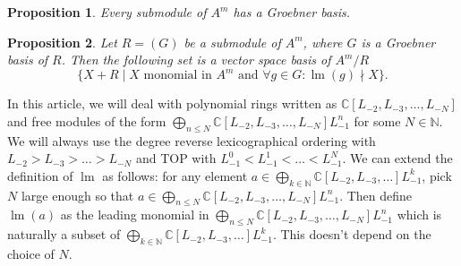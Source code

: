 \documentclass[12pt,a4paper]{article}
\newtheorem{proposition}{Proposition}
\DeclareMathOperator{\lm}{lm}
\begin{document}
\begin{proposition}
  \label{prp:7}
  Every submodule of $A^m$ has a Groebner basis.
\end{proposition}

\begin{proposition}
  \label{prp:8}
  Let $R=(G)$ be a submodule of $A^m$, where $G$ is a Groebner basis of $R$.
  Then the following set is a vector space basis of $A^m/R$
  \begin{equation*}
    \{X+R\mid X \text{ monomial in } A^m\text{ and } \forall g\in G: \lm(g)\nmid X\}.
  \end{equation*}
\end{proposition}
In this article, we will deal with polynomial rings written as $\mathbb{C}[L_{-2},L_{-3},\dots,L_{-N}]$ and free modules of the form $\bigoplus_{n\le N}\mathbb{C}[L_{-2},L_{-3},\dots,L_{-N}]L_{-1}^n$ for some $N\in \mathbb{N}$.
We will always use the degree reverse lexicographical ordering with $L_{-2}>L_{-3}>\dots>L_{-N}$ and TOP with $L_{-1}^0<L_{-1}^1<\dots<L_{-1}^N$.
We can extend the definition of $\lm$ as follows: for any element $a\in \bigoplus_{k\in \mathbb{N}}\mathbb{C}[L_{-2},L_{-3},\dots]L_{-1}^k$, pick $N$ large enough so that $a\in \bigoplus_{n\le N}\mathbb{C}[L_{-2},L_{-3},\dots,L_{-N}]L_{-1}^n$.
Then define $\lm(a)$ as the leading monomial in $\bigoplus_{n\le N}\mathbb{C}[L_{-2},L_{-3},\dots,L_{-N}]L_{-1}^n$ which is naturally a subset of $\bigoplus_{k\in \mathbb{N}}\mathbb{C}[L_{-2},L_{-3},\dots]L_{-1}^k$.
This doesn't depend on the choice of $N$.
\end{document}

